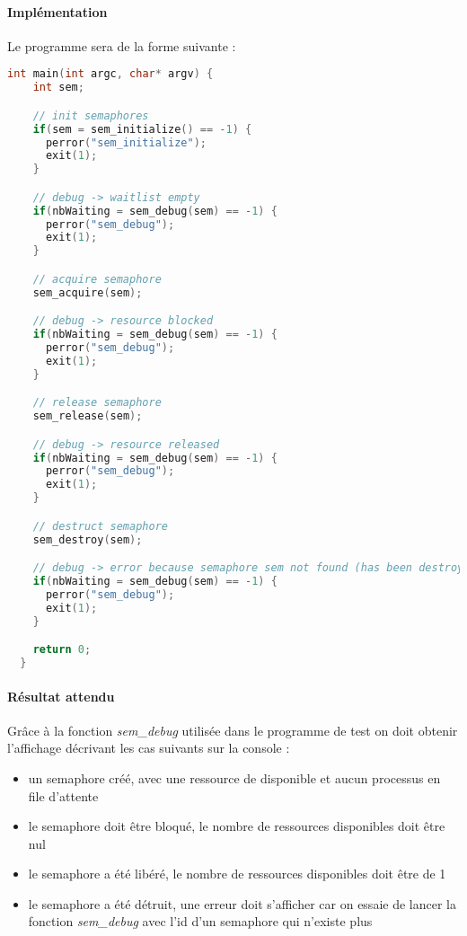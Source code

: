 \documentclass[12pt]{article}
\begin{document}
  \paragraph{Implémentation\\}
  Le programme sera de la forme suivante :
  \begin{lstlisting}[language=C]
  int main(int argc, char* argv) {
    int sem;

    // init semaphores
    if(sem = sem_initialize() == -1) {
      perror("sem_initialize");
      exit(1);
    }

    // debug -> waitlist empty
    if(nbWaiting = sem_debug(sem) == -1) {
      perror("sem_debug");
      exit(1);
    }

    // acquire semaphore
    sem_acquire(sem);

    // debug -> resource blocked
    if(nbWaiting = sem_debug(sem) == -1) {
      perror("sem_debug");
      exit(1);
    }

    // release semaphore
    sem_release(sem);

    // debug -> resource released
    if(nbWaiting = sem_debug(sem) == -1) {
      perror("sem_debug");
      exit(1);
    }

    // destruct semaphore
    sem_destroy(sem);

    // debug -> error because semaphore sem not found (has been destroyed)
    if(nbWaiting = sem_debug(sem) == -1) {
      perror("sem_debug");
      exit(1);
    }

    return 0;
  }
  \end{lstlisting}
  \paragraph{Résultat attendu\\}
  Grâce à la fonction \textit{sem\_debug} utilisée dans le programme de test on doit obtenir l'affichage décrivant les cas suivants sur la console :
  \begin{itemize}
    \item un semaphore créé, avec une ressource de disponible et aucun processus en file d'attente
    \item le semaphore doit être bloqué, le nombre de ressources disponibles doit être nul
    \item le semaphore a été libéré, le nombre de ressources disponibles doit être de 1
    \item le semaphore a été détruit, une erreur doit s'afficher car on essaie de lancer la fonction \textit{sem\_debug} avec l'id d'un semaphore qui n'existe plus
  \end{itemize}
\end{document}
